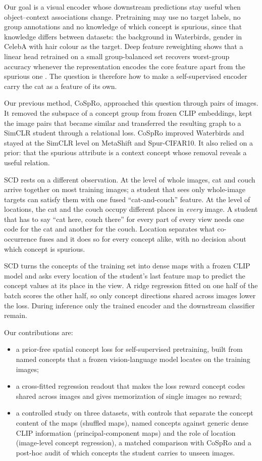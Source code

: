 \documentclass{article}
\begin{document}
Our goal is a visual encoder whose downstream predictions stay useful when object--context associations change. Pretraining may use no target labels, no group annotations and no knowledge of which concept is spurious, since that knowledge differs between datasets: the background in Waterbirds, gender in CelebA with hair colour as the target. Deep feature reweighting shows that a linear head retrained on a small group-balanced set recovers worst-group accuracy whenever the representation encodes the core feature apart from the spurious one \citep{kirichenko2023dfr}. The question is therefore how to make a self-supervised encoder carry the cat as a feature of its own.

Our previous method, CoSpRo, approached this question through pairs of images. It removed the subspace of a concept group from frozen CLIP embeddings, kept the image pairs that became similar and transferred the resulting graph to a SimCLR student through a relational loss. CoSpRo improved Waterbirds and stayed at the SimCLR level on MetaShift and Spur-CIFAR10. It also relied on a prior: that the spurious attribute is a context concept whose removal reveals a useful relation.

SCD rests on a different observation. At the level of whole images, cat and couch arrive together on most training images; a student that sees only whole-image targets can satisfy them with one fused ``cat-and-couch'' feature. At the level of locations, the cat and the couch occupy different places in \emph{every} image. A student that has to say ``cat here, couch there'' for every part of every view needs one code for the cat and another for the couch. Location separates what co-occurrence fuses and it does so for every concept alike, with no decision about which concept is spurious.

SCD turns the concepts of the training set into dense maps with a frozen CLIP model and asks every location of the student's last feature map to predict the concept values at its place in the view. A ridge regression fitted on one half of the batch scores the other half, so only concept directions shared across images lower the loss. During inference only the trained encoder and the downstream classifier remain.

Our contributions are:
\begin{itemize}
\item a prior-free spatial concept loss for self-supervised pretraining, built from named concepts that a frozen vision-language model locates on the training images;
\item a cross-fitted regression readout that makes the loss reward concept codes shared across images and gives memorization of single images no reward;
\item a controlled study on three datasets, with controls that separate the concept content of the maps (shuffled maps), named concepts against generic dense CLIP information (principal-component maps) and the role of location (image-level concept regression), a matched comparison with CoSpRo and a post-hoc audit of which concepts the student carries to unseen images.
\end{itemize}
\end{document}
